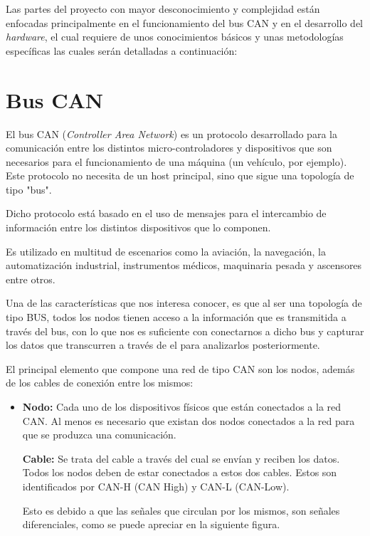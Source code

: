 
Las partes del proyecto con mayor desconocimiento y complejidad están enfocadas principalmente en el funcionamiento del bus CAN y en el desarrollo del \emph{hardware}, el cual requiere de unos conocimientos básicos y unas metodologías específicas las cuales serán detalladas a continuación:

\section{Bus CAN}\label{bus_can}

El bus CAN (\emph{Controller Area Network}) es un protocolo desarrollado para la comunicación entre los distintos micro-controladores y dispositivos que son necesarios para el funcionamiento de una máquina (un vehículo, por ejemplo). Este protocolo no necesita de un host principal, sino que sigue una topología de tipo "bus".


Dicho protocolo está basado en el uso de mensajes para el intercambio de información entre los distintos dispositivos que lo componen.

Es utilizado en multitud de escenarios como la aviación, la navegación, la automatización industrial, instrumentos médicos, maquinaria pesada y ascensores entre otros.

Una de las características que nos interesa conocer, es que al ser una topología de tipo BUS, todos los nodos tienen acceso a la información que es transmitida a través del bus, con lo que nos es suficiente con conectarnos a dicho bus y capturar los datos que transcurren a través de el para analizarlos posteriormente.


El principal elemento que compone una red de tipo CAN son los nodos, además de los cables de conexión entre los mismos:

\begin{itemize}
\item
\textbf{Nodo:} Cada uno de los dispositivos físicos que están conectados a la red CAN. Al menos es necesario que existan dos nodos conectados a la red para que se produzca una comunicación.

\textbf{Cable:} Se trata del cable a través del cual se envían y reciben los datos. Todos los nodos deben de estar conectados a estos dos cables. Estos son identificados por CAN-H (CAN High) y CAN-L (CAN-Low).

Esto es debido a que las señales que circulan por los mismos, son señales diferenciales, como se puede apreciar en la siguiente figura.


\end{itemize}




